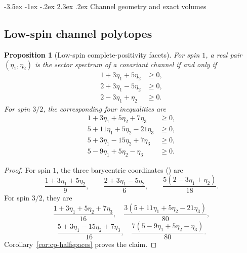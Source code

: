 \documentclass[twoside,10pt]{article}
\makeatletter
\numberwithin{equation}{section}
\theoremstyle{slbody}
\newtheorem{proposition}[theorem]{Proposition}
\theoremstyle{definition}
\theoremstyle{remark}
\renewcommand{\section}{%
  \@startsection{section}{1}{\z@}%
    {-3.5ex \@plus -1ex \@minus -.2ex}%
    {2.3ex \@plus .2ex}%
    {\normalfont\large\bfseries}}
\renewcommand{\eqref}[1]{%
  \textup{{\normalfont(\oldstylenums{\ref{#1}}}\normalfont)}}
\makeatother
\begin{document}
\section{Channel geometry and exact volumes}

\subsection{Low-spin channel polytopes}

\begin{proposition}[Low-spin complete-positivity facets]
\label{prop:low-spin-cp-facets}
For spin \(1\), a real pair \((\eta_1,\eta_2)\) is the sector
spectrum of a covariant channel if and only if
\begin{align}
 1+3\eta_1+5\eta_2&\geq0,                                  \label{eq:spin-one-cp-one}\\
 2+3\eta_1-5\eta_2&\geq0,                                  \label{eq:spin-one-cp-two}\\
 2-3\eta_1+\eta_2&\geq0.                                   \label{eq:spin-one-cp-three}
\end{align}
For spin \(3/2\), the corresponding four inequalities are
\begin{align}
 1+3\eta_1+5\eta_2+7\eta_3&\geq0,                          \label{eq:spin-three-cp-one}\\
 5+11\eta_1+5\eta_2-21\eta_3&\geq0,                        \label{eq:spin-three-cp-two}\\
 5+3\eta_1-15\eta_2+7\eta_3&\geq0,                         \label{eq:spin-three-cp-three}\\
 5-9\eta_1+5\eta_2-\eta_3&\geq0.                           \label{eq:spin-three-cp-four}
\end{align}
\end{proposition}

\begin{proof}
For spin \(1\), the three barycentric coordinates
\eqref{eq:barycentric-weights} are
\begin{equation*}
 \frac{1+3\eta_1+5\eta_2}{9},\qquad
 \frac{2+3\eta_1-5\eta_2}{6},\qquad
 \frac{5(2-3\eta_1+\eta_2)}{18}.
\end{equation*}
For spin \(3/2\), they are
\begin{equation*}
 \frac{1+3\eta_1+5\eta_2+7\eta_3}{16},\quad
 \frac{3(5+11\eta_1+5\eta_2-21\eta_3)}{80},
\end{equation*}
\begin{equation*}
 \frac{5+3\eta_1-15\eta_2+7\eta_3}{16},\quad
 \frac{7(5-9\eta_1+5\eta_2-\eta_3)}{80}.
\end{equation*}
Corollary~\ref{cor:cp-halfspaces} proves the claim.
\end{proof}
\end{document}
